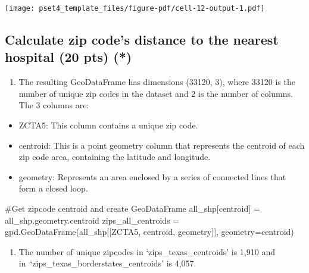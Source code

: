 \documentclass[
  letterpaper,
  DIV=11,
  numbers=noendperiod]{scrartcl}
\newenvironment{Shaded}{\begin{snugshade}}{\end{snugshade}}
\newcommand{\CommentTok}[1]{\textcolor[rgb]{0.37,0.37,0.37}{#1}}
\newcommand{\NormalTok}[1]{\textcolor[rgb]{0.00,0.23,0.31}{#1}}
\newcommand{\OperatorTok}[1]{\textcolor[rgb]{0.37,0.37,0.37}{#1}}
\newcommand{\StringTok}[1]{\textcolor[rgb]{0.13,0.47,0.30}{#1}}
\providecommand{\tightlist}{%
  \setlength{\itemsep}{0pt}\setlength{\parskip}{0pt}}\usepackage{longtable,booktabs,array}
\begin{document}
\texttt{[image: pset4\_template\_files/figure-pdf/cell-12-output-1.pdf]}

\subsection{Calculate zip code's distance to the nearest hospital (20
pts)
(*)}\label{calculate-zip-codes-distance-to-the-nearest-hospital-20-pts}

\begin{enumerate}
\def\labelenumi{\arabic{enumi}.}
\tightlist
\item
  The resulting GeoDataFrame has dimensions (33120, 3), where 33120 is
  the number of unique zip codes in the dataset and 2 is the number of
  columns. The 3 columns are:\\
\end{enumerate}

\begin{itemize}
\tightlist
\item
  ZCTA5: This column contains a unique zip code.\\
\item
  centroid: This is a point geometry column that represents the centroid
  of each zip code area, containing the latitude and longitude.\\
\item
  geometry: Represents an area enclosed by a series of connected lines
  that form a closed loop.
\end{itemize}

\begin{Shaded}
\begin{Highlighting}[]
\CommentTok{\#Get zipcode centroid and create GeoDataFrame}
\NormalTok{all\_shp[}\StringTok{\textquotesingle{}centroid\textquotesingle{}}\NormalTok{] }\OperatorTok{=}\NormalTok{ all\_shp.geometry.centroid}
\NormalTok{zips\_all\_centroids }\OperatorTok{=}\NormalTok{ gpd.GeoDataFrame(all\_shp[[}\StringTok{\textquotesingle{}ZCTA5\textquotesingle{}}\NormalTok{, }\StringTok{\textquotesingle{}centroid\textquotesingle{}}\NormalTok{, }\StringTok{\textquotesingle{}geometry\textquotesingle{}}\NormalTok{]], geometry}\OperatorTok{=}\StringTok{\textquotesingle{}centroid\textquotesingle{}}\NormalTok{)}
\end{Highlighting}
\end{Shaded}

\begin{enumerate}
\def\labelenumi{\arabic{enumi}.}
\setcounter{enumi}{1}
\tightlist
\item
  The number of unique zipcodes in `zips\_texas\_centroids' is 1,910 and
  in~`zips\_texas\_borderstates\_centroids' is 4,057.
\end{enumerate}
\end{document}
